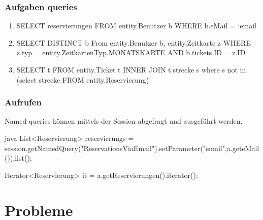	\subsubsection{Aufgaben queries}
	
	\begin{enumerate}
		\item SELECT reservierungen FROM entity.Benutzer b WHERE b.eMail = :email
		\item SELECT DISTINCT b From entity.Benutzer b, entity.Zeitkarte z WHERE z.typ = entity.ZeitkartenTyp.MONATSKARTE AND b.tickets.ID = z.ID
		\item SELECT t FROM entity.Ticket t INNER JOIN t.strecke s where s not in (select strecke FROM entity.Reservierung)
	\end{enumerate}
	
	\subsubsection{Aufrufen}
		Named-queries können mittels der Session abgefragt und ausgeführt werden.
	\begin{code}[]{java}
		List<Reservierung> reservierungs = session.getNamedQuery("ReservationsViaEmail").setParameter("email",a.geteMail()).list();
		
		Iterator<Reservierung> it = a.getReservierungen().iterator();	
	\end{code}

	\clearpage

\section{Probleme}
	
	
